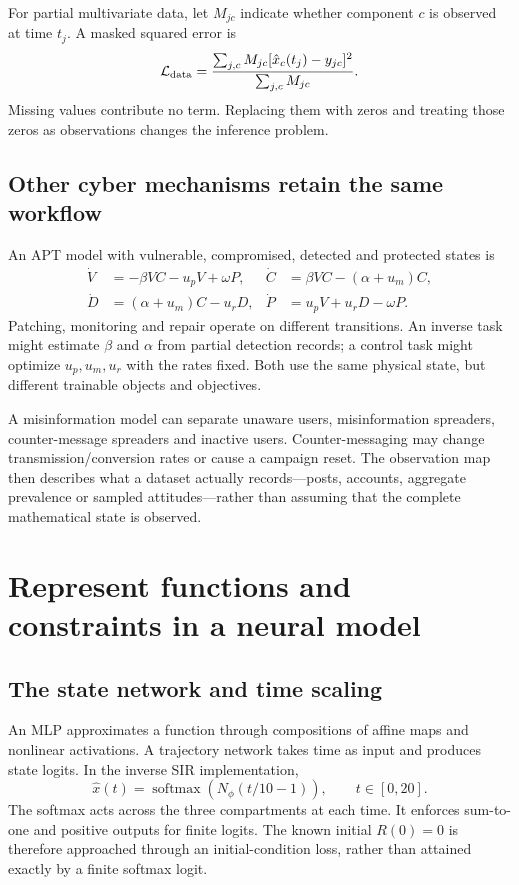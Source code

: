 \documentclass[11pt,a4paper]{article}
\theoremstyle{definition}
\theoremstyle{remark}
\begin{document}
For partial multivariate data, let $M_{jc}$ indicate whether component $c$ is observed at time $t_j$. A masked squared error is
\begin{equation}
\mathcal L_{\rm data}=
\frac{\sum_{j,c}M_{jc}[\hat x_c(t_j)-y_{jc}]^2}{\sum_{j,c}M_{jc}}.
\end{equation}
Missing values contribute no term. Replacing them with zeros and treating those zeros as observations changes the inference problem.

\subsection{Other cyber mechanisms retain the same workflow}
An APT model with vulnerable, compromised, detected and protected states is
\begin{align}
\dot V&=-\beta VC-u_pV+\omega P, &
\dot C&=\beta VC-(\alpha+u_m)C,\nonumber\\
\dot D&=(\alpha+u_m)C-u_rD, &
\dot P&=u_pV+u_rD-\omega P.
\end{align}
Patching, monitoring and repair operate on different transitions. An inverse task might estimate $\beta$ and $\alpha$ from partial detection records; a control task might optimize $u_p,u_m,u_r$ with the rates fixed. Both use the same physical state, but different trainable objects and objectives.

A misinformation model can separate unaware users, misinformation spreaders, counter-message spreaders and inactive users. Counter-messaging may change transmission/conversion rates or cause a campaign reset. The observation map then describes what a dataset actually records---posts, accounts, aggregate prevalence or sampled attitudes---rather than assuming that the complete mathematical state is observed.

\section{Represent functions and constraints in a neural model}
\subsection{The state network and time scaling}
An MLP approximates a function through compositions of affine maps and nonlinear activations. A trajectory network takes time as input and produces state logits. In the inverse SIR implementation,
\begin{equation}
\hat x(t)=\operatorname{softmax}(N_\phi(t/10-1)),
\qquad t\in[0,20].
\end{equation}
The softmax acts across the three compartments at each time. It enforces sum-to-one and positive outputs for finite logits. The known initial $R(0)=0$ is therefore approached through an initial-condition loss, rather than attained exactly by a finite softmax logit.
\end{document}
